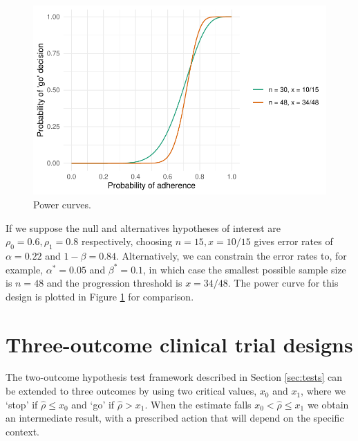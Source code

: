 \documentclass[sagev]{sagej} %
\begin{document}
\begin{figure}
\centering
\includegraphics[scale=0.8]{./figures/power}
\caption{Power curves.}
\label{fig:power}
\end{figure}

If we suppose the null and alternatives hypotheses of interest are $\rho_0 = 0.6, \rho_1 = 0.8$ respectively, choosing $n = 15, x = 10/15$ gives error rates of $\alpha = 0.22$ and $1 - \beta = 0.84$. Alternatively, we can constrain the error rates to, for example, $\alpha^* = 0.05$ and $\beta^* = 0.1$, in which case the smallest possible sample size is $n = 48$ and the progression threshold is $x = 34/48$. The power curve for this design is plotted in Figure \ref{fig:power} for comparison. 

\section{Three-outcome clinical trial designs}\label{sec:review}

The two-outcome hypothesis test framework described in Section \ref{sec:tests} can be extended to three outcomes by using two critical values, $x_0$ and $x_1$, where we `stop' if $\hat{\rho} \leq x_0$ and `go' if $\hat{\rho} > x_1$. When the estimate falls $x_0 < \hat{\rho} \leq x_1$ we obtain an intermediate result, with a prescribed action that will depend on the specific context.
\end{document}
